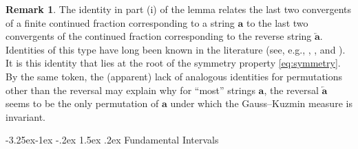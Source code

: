 \documentclass[10pt]{article}
\makeatletter
\renewcommand\subsection{\@startsection{subsection}{2}{\z@}
{-3.25ex\@plus -1ex \@minus -.2ex}
{1.5ex \@plus .2ex}
{\normalfont\normalsize\bfseries\boldmath}}
\theoremstyle{definition}
\newtheorem{remark}[lemma]{Remark}
\numberwithin{equation}{section}
\numberwithin{lemma}{section}
\newcommand{\bfa}{\mathbf{a}}
\newcommand{\bfar}{\overleftarrow{\bfa}}
\makeatother
\begin{document}
\begin{remark}
\label{rem:symmetry-property}
The identity in part (i) of the lemma relates the last two
convergents of a finite continued fraction corresponding to a string
$\bfa$ to the last two convergents of the continued fraction
corresponding to the reverse string $\bfar$. 
Identities of this type have long been known in the literature (see,
e.g., \cite[\S 11]{perron-book}, \cite[p.~189]{levy1929}, 
and \cite[Theorem 6]{khinchin-book}).
It is this identity that
lies at the root of the symmetry property \eqref{eq:symmetry}. By the
same token, the (apparent) lack of analogous identities for permutations
other than the reversal may explain why for
``most'' strings $\bfa$, the reversal $\bfar$ seems to be the only
permutation of $\bfa$ under which the Gauss--Kuzmin measure is invariant.
\end{remark}

\subsection{Fundamental Intervals}
\end{document}
